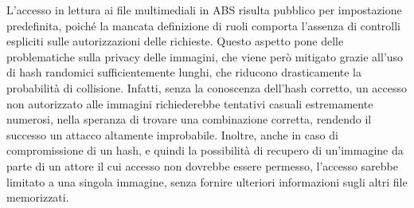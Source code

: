 L'accesso in lettura ai file multimediali in ABS risulta pubblico per impostazione predefinita, 
poiché la mancata definizione di ruoli comporta
l'assenza di controlli espliciti sulle autorizzazioni delle richieste. 
Questo aspetto pone delle problematiche sulla privacy delle immagini, 
che viene però mitigato grazie all'uso di hash randomici sufficientemente lunghi, 
che riducono drasticamente la probabilità di collisione. 
Infatti, senza la conoscenza dell'hash corretto, 
un accesso non autorizzato alle immagini 
richiederebbe tentativi casuali estremamente numerosi,
nella speranza di trovare una combinazione corretta, 
rendendo il successo un attacco altamente improbabile. 
Inoltre, anche in caso di compromissione di un hash, 
e quindi la possibilità di recupero di un'immagine da parte di un attore 
il cui accesso non dovrebbe essere permesso,
l'accesso sarebbe limitato a una singola immagine, 
senza fornire ulteriori informazioni sugli altri file memorizzati.
\clearpage